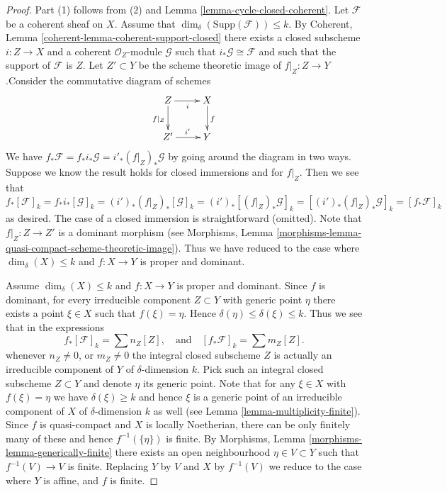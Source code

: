 \begin{proof}
Part (1) follows from (2) and Lemma \ref{lemma-cycle-closed-coherent}.
Let $\mathcal{F}$ be a coherent sheaf on $X$.
Assume that $\dim_\delta(\text{Supp}(\mathcal{F})) \leq k$.
By Coherent, Lemma \ref{coherent-lemma-coherent-support-closed}
there exists a closed subscheme $i : Z \to X$ and a coherent
$\mathcal{O}_Z$-module $\mathcal{G}$ such that
$i_*\mathcal{G} \cong \mathcal{F}$ and such that the support
of $\mathcal{F}$ is $Z$. Let $Z' \subset Y$ be the scheme theoretic image
of $f|_Z : Z \to Y$.Consider the commutative diagram of schemes
$$
\xymatrix{
Z \ar[r]_i \ar[d]_{f|_Z} &
X \ar[d]^f \\
Z' \ar[r]^{i'} & Y
}
$$
We have $f_*\mathcal{F} = f_*i_*\mathcal{G} = i'_*(f|_Z)_*\mathcal{G}$
by going around the diagram in two ways. Suppose we know the result holds
for closed immersions and for $f|_Z$. Then we see that
$$
f_*[\mathcal{F}]_k = f_*i_*[\mathcal{G}]_k
= (i')_*(f|_Z)_*[\mathcal{G}]_k =
(i')_*[(f|_Z)_*\mathcal{G}]_k =
[(i')_*(f|_Z)_*\mathcal{G}]_k = [f_*\mathcal{F}]_k
$$
as desired. The case of a closed immersion is straightforward (omitted).
Note that $f|_Z : Z \to Z'$ is a dominant morphism (see
Morphisms, Lemma \ref{morphisms-lemma-quasi-compact-scheme-theoretic-image}).
Thus we have reduced to the case where
$\dim_\delta(X) \leq k$ and $f : X \to Y$ is proper and dominant.

\medskip\noindent
Assume $\dim_\delta(X) \leq k$ and $f : X \to Y$ is proper and dominant.
Since $f$ is dominant, for every irreducible component $Z \subset Y$
with generic point $\eta$ there exists a point $\xi \in X$ such
that $f(\xi) = \eta$. Hence $\delta(\eta) \leq \delta(\xi) \leq k$.
Thus we see that in the expressions
$$
f_*[\mathcal{F}]_k = \sum n_Z[Z],
\quad
\text{and}
\quad
[f_*\mathcal{F}]_k = \sum m_Z[Z].
$$
whenever $n_Z \not = 0$, or $m_Z \not = 0$ the integral closed
subscheme $Z$ is actually an irreducible component of $Y$ of
$\delta$-dimension $k$. Pick such an integral closed subscheme
$Z \subset Y$ and denote $\eta$ its generic point. Note that for
any $\xi \in X$ with $f(\xi) = \eta$ we have $\delta(\xi) \geq k$
and hence $\xi$ is a generic point of an irreducible component
of $X$ of $\delta$-dimension $k$ as well
(see Lemma \ref{lemma-multiplicity-finite}). Since $f$ is quasi-compact
and $X$ is locally Noetherian, there can be only finitely many of
these and hence $f^{-1}(\{\eta\})$ is finite.
By Morphisms, Lemma \ref{morphisms-lemma-generically-finite} there exists
an open neighbourhood $\eta \in V \subset Y$ such that $f^{-1}(V) \to V$
is finite. Replacing $Y$ by $V$ and $X$ by $f^{-1}(V)$ we reduce to the
case where $Y$ is affine, and $f$ is finite.


\end{proof}
